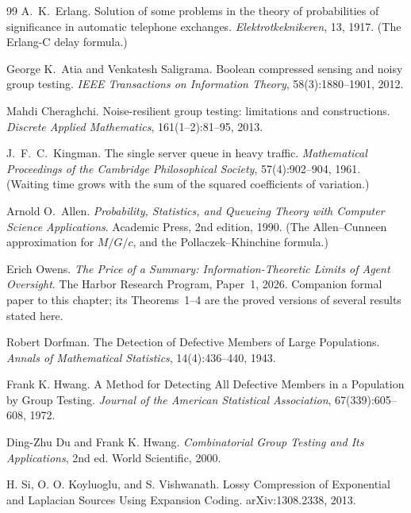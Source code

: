 \documentclass[11pt,a4paper]{article}
\theoremstyle{definition}
\theoremstyle{plain}
\begin{document}
\begin{thebibliography}{99}
A.\ K.\ Erlang.
\newblock Solution of some problems in the theory of probabilities of significance in automatic telephone exchanges.
\newblock \textit{Elektrotkeknikeren}, 13, 1917. (The Erlang-C delay formula.)

George K.\ Atia and Venkatesh Saligrama.
\newblock Boolean compressed sensing and noisy group testing.
\newblock \textit{IEEE Transactions on Information Theory}, 58(3):1880--1901, 2012.

Mahdi Cheraghchi.
\newblock Noise-resilient group testing: limitations and constructions.
\newblock \textit{Discrete Applied Mathematics}, 161(1--2):81--95, 2013.

J.\ F.\ C.\ Kingman.
\newblock The single server queue in heavy traffic.
\newblock \textit{Mathematical Proceedings of the Cambridge Philosophical Society}, 57(4):902--904, 1961. (Waiting time grows with the sum of the squared coefficients of variation.)

Arnold O.\ Allen.
\newblock \textit{Probability, Statistics, and Queueing Theory with Computer Science Applications}.
\newblock Academic Press, 2nd edition, 1990. (The Allen--Cunneen approximation for $M/G/c$, and the Pollaczek--Khinchine formula.)

Erich Owens.
\newblock \textit{The Price of a Summary: Information-Theoretic Limits of Agent Oversight}.
\newblock The Harbor Research Program, Paper~1, 2026. Companion formal paper to this
chapter; its Theorems~1--4 are the proved versions of several results stated here.

Robert Dorfman.
\newblock The Detection of Defective Members of Large Populations.
\newblock \textit{Annals of Mathematical Statistics}, 14(4):436--440, 1943.

Frank K. Hwang.
\newblock A Method for Detecting All Defective Members in a Population by Group Testing.
\newblock \textit{Journal of the American Statistical Association}, 67(339):605--608, 1972.

Ding-Zhu Du and Frank K. Hwang.
\newblock \textit{Combinatorial Group Testing and Its Applications}, 2nd ed.
\newblock World Scientific, 2000.

H. Si, O. O. Koyluoglu, and S. Vishwanath.
\newblock Lossy Compression of Exponential and Laplacian Sources Using Expansion Coding.
\newblock arXiv:1308.2338, 2013.


\end{thebibliography}
\end{document}
